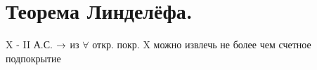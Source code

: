 \documentclass[geometry.tex]{subfiles}
\begin{document}
  \section{Теорема Линделёфа.}

  \begin{theorem}
      X - II А.С. $\rightarrow$ из $\forall$ откр. покр. X можно извлечь не более чем счетное подпокрытие
  \end{theorem}
\end{document}

